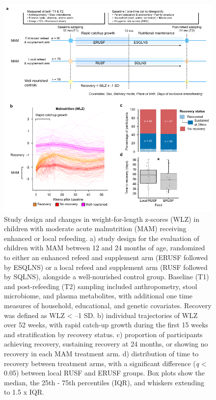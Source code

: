 \documentclass{article}
\begin{document}
\begin{figure}[H]
	\centering
	\includegraphics[scale=1.2]{figures/recovery2.pdf}
	\caption[Study design and changes in weight-for-length z-scores (WLZ) in children with moderate acute malnutrition (MAM) receiving enhanced or local refeeding]{
		Study design and changes in weight-for-length z-scores (WLZ) in children with moderate acute malnutrition (MAM) receiving enhanced or local refeeding.
		a) study design for the evaluation of children with MAM between 12 and 24 months of age, randomized to either an enhanced refeed and supplement arm (ERUSF followed by ESQLNS) or a local refeed and supplement arm (RUSF followed by SQLNS), alongside a well-nourished control group. Baseline (T1) and post-refeeding (T2) sampling included anthropometry, stool microbiome, and plasma metabolites, with additional one time measures of household, educational, and genetic covariates. Recovery was defined as WLZ \textless{} –1 SD.
		b) individual trajectories of WLZ over 52 weeks, with rapid catch-up growth during the first 15 weeks and stratification by recovery status.
		c) proportion of participants achieving recovery, sustaining recovery at 24 months, or showing no recovery in each MAM treatment arm.
		d) distribution of time to recovery between treatment arms, with a significant difference (\textit{q} \textless{} 0.05) between local RUSF and ERUSF groups. Box plots show the median, the 25th - 75th percentiles (IQR), and whiskers extending to 1.5 x IQR.
	}
	\label{Figure1}
\end{figure}
\end{document}
